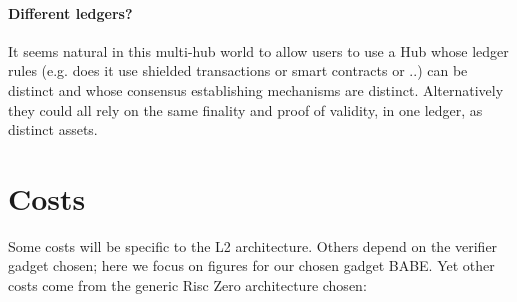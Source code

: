 \documentclass[11pt]{article}
\begin{document}
\paragraph{Different ledgers?} It seems natural in this multi-hub world to allow users to use a Hub whose ledger rules (e.g. does it use shielded transactions or smart contracts or ..) can be distinct and whose consensus establishing mechanisms are distinct. Alternatively they could all rely on the same finality and proof of validity, in one ledger, as distinct assets.

\section{Costs}
\label{sec:costs}

Some costs will be specific to the L2 architecture. Others depend on the verifier gadget chosen; here we focus on figures for our chosen gadget BABE. Yet other costs come from the generic Risc Zero architecture chosen:
\end{document}
